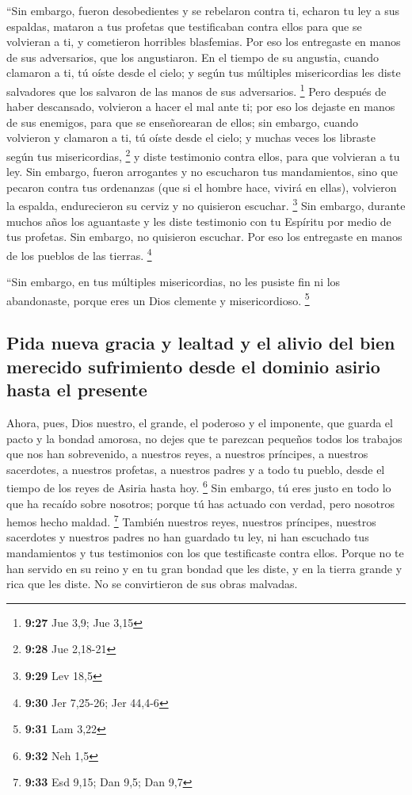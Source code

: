  ``Sin embargo, fueron desobedientes y se rebelaron
contra ti, echaron tu ley a sus espaldas, mataron a tus profetas que
testificaban contra ellos para que se volvieran a ti, y cometieron
horribles blasfemias.  Por eso los entregaste en manos de
sus adversarios, que los angustiaron. En el tiempo de su angustia,
cuando clamaron a ti, tú oíste desde el cielo; y según tus múltiples
misericordias les diste salvadores que los salvaron de las manos de sus
adversarios. \footnote{\textbf{9:27} Jue 3,9; Jue 3,15} 
Pero después de haber descansado, volvieron a hacer el mal ante ti; por
eso los dejaste en manos de sus enemigos, para que se enseñorearan de
ellos; sin embargo, cuando volvieron y clamaron a ti, tú oíste desde el
cielo; y muchas veces los libraste según tus misericordias, \footnote{\textbf{9:28}
  Jue 2,18-21}  y diste testimonio contra ellos, para que
volvieran a tu ley. Sin embargo, fueron arrogantes y no escucharon tus
mandamientos, sino que pecaron contra tus ordenanzas (que si el hombre
hace, vivirá en ellas), volvieron la espalda, endurecieron su cerviz y
no quisieron escuchar. \footnote{\textbf{9:29} Lev 18,5} 
Sin embargo, durante muchos años los aguantaste y les diste testimonio
con tu Espíritu por medio de tus profetas. Sin embargo, no quisieron
escuchar. Por eso los entregaste en manos de los pueblos de las tierras.
\footnote{\textbf{9:30} Jer 7,25-26; Jer 44,4-6}

 ``Sin embargo, en tus múltiples misericordias, no les
pusiste fin ni los abandonaste, porque eres un Dios clemente y
misericordioso. \footnote{\textbf{9:31} Lam 3,22}

\hypertarget{pida-nueva-gracia-y-lealtad-y-el-alivio-del-bien-merecido-sufrimiento-desde-el-dominio-asirio-hasta-el-presente}{%
\subsection{Pida nueva gracia y lealtad y el alivio del bien merecido
sufrimiento desde el dominio asirio hasta el
presente}\label{pida-nueva-gracia-y-lealtad-y-el-alivio-del-bien-merecido-sufrimiento-desde-el-dominio-asirio-hasta-el-presente}}

 Ahora, pues, Dios nuestro, el grande, el poderoso y el
imponente, que guarda el pacto y la bondad amorosa, no dejes que te
parezcan pequeños todos los trabajos que nos han sobrevenido, a nuestros
reyes, a nuestros príncipes, a nuestros sacerdotes, a nuestros profetas,
a nuestros padres y a todo tu pueblo, desde el tiempo de los reyes de
Asiria hasta hoy. \footnote{\textbf{9:32} Neh 1,5}  Sin
embargo, tú eres justo en todo lo que ha recaído sobre nosotros; porque
tú has actuado con verdad, pero nosotros hemos hecho maldad. \footnote{\textbf{9:33}
  Esd 9,15; Dan 9,5; Dan 9,7}  También nuestros reyes,
nuestros príncipes, nuestros sacerdotes y nuestros padres no han
guardado tu ley, ni han escuchado tus mandamientos y tus testimonios con
los que testificaste contra ellos.  Porque no te han
servido en su reino y en tu gran bondad que les diste, y en la tierra
grande y rica que les diste. No se convirtieron de sus obras malvadas.

